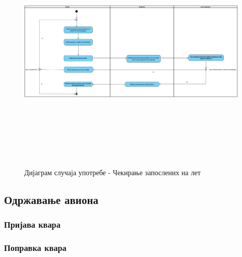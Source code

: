 \documentclass{article}
\begin{document}
\begin{figure}[H]
    \centering
    \includegraphics[width=1.1\textwidth, height=12cm]{Dijagrami_slike/cekiranje_putnika.png}
    \caption{Дијаграм случаја употребе - Чекирање запослених на лет}
\end{figure}

\newpage
\subsection{Одржавање авиона}

\subsubsection{Пријава квара}

\newpage
\subsubsection{Поправка квара}
\end{document}
